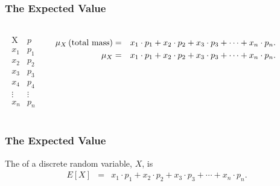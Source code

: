  \begin{frame}
 \frametitle{The Expected Value}
   \begin{columns}
     \begin{eqnarray*}
       \begin{array}{r|l}
         \mathrm{X} & p \\ \hline
          x_1 & p_1 \\ [5pt]
          x_2 & p_2 \\ [5pt]
          x_3 & p_3 \\ [5pt]
          x_4 & p_4 \\
          \vdots & \vdots \\
          x_n & p_n
       \end{array}
     \end{eqnarray*}

     {
       \begin{eqnarray*}
         \mu_X \left(\mathrm{total~mass}\right) & = & x_1 \cdot p_1 + x_2\cdot p_2 + 
                 x_3 \cdot p_3 + \cdots + x_n \cdot p_n. \\
         \mu_X  & = & x_1 \cdot p_1 + x_2 \cdot p_2 + x_3 \cdot p_3 + \cdots + x_n \cdot p_n.
       \end{eqnarray*}
     }

   \end{columns}

 \end{frame}


 \begin{frame}
 \frametitle{The Expected Value}

 \begin{definition}
   The  of a discrete random variable, $X$, is
   \begin{eqnarray*}
     E[X] & = & x_1 \cdot p_1 + x_2 \cdot p_2 + x_3 \cdot p_3 + \cdots + x_n \cdot p_n.
   \end{eqnarray*}
 \end{definition}

 \end{frame}



